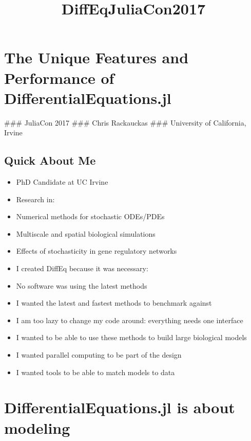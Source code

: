 \documentclass[11pt]{article}
\title{DiffEqJuliaCon2017}
\begin{document}
    
    
    \maketitle
    
    

    
    \section{The Unique Features and Performance of
DifferentialEquations.jl}\label{the-unique-features-and-performance-of-differentialequations.jl}

 \#\#\# JuliaCon 2017 \#\#\# Chris Rackauckas \#\#\# University of
California, Irvine

    \subsection{Quick About Me}\label{quick-about-me}

\begin{itemize}
\itemsep1pt\parskip0pt
\item
  PhD Candidate at UC Irvine
\item
  Research in:
\item
  Numerical methods for stochastic ODEs/PDEs
\item
  Multiscale and spatial biological simulations
\item
  Effects of stochasticity in gene regulatory networks
\item
  I created DiffEq because it was necessary:
\item
  No software was using the latest methods
\item
  I wanted the latest and fastest methods to benchmark against
\item
  I am too lazy to change my code around: everything needs one interface
\item
  I wanted to be able to use these methods to build large biological
  models
\item
  I wanted parallel computing to be part of the design
\item
  I wanted tools to be able to match models to data
\end{itemize}

    \section{DifferentialEquations.jl is about
modeling}\label{differentialequations.jl-is-about-modeling}
\end{document}
